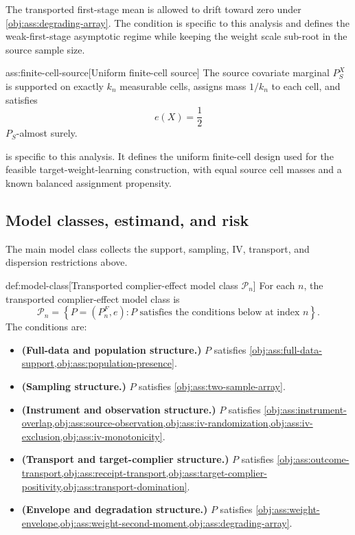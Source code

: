 The transported first-stage mean  is allowed to drift toward zero under \cref{obj:ass:degrading-array}. The condition is specific to this analysis and defines the weak-first-stage asymptotic regime while keeping the weight scale sub-root in the source sample size.

\begin{assumptionv}{ass:finite-cell-source}[Uniform finite-cell source]
The source covariate marginal \(P_S^X\) is supported on exactly \(k_n\) measurable cells, assigns mass \(1/k_n\) to each cell, and satisfies
\[
e(X)=\frac12
\]
\(P_S\)-almost surely.
\end{assumptionv}

 is specific to this analysis. It defines the uniform finite-cell design used for the feasible target-weight-learning construction, with equal source cell masses and a known balanced assignment propensity.

\subsection{Model classes, estimand, and risk}

The main model class collects the support, sampling, IV, transport, and dispersion restrictions above.

\begin{definitionv}{def:model-class}[Transported complier-effect model class \(\mathcal P_n\)]
For each \(n\), the transported complier-effect model class is
\[
\mathcal P_n
=
\left\{
P=(P_n^F,e):
P \text{ satisfies the conditions below at index } n
\right\}.
\]
The conditions are:
\begin{itemize}
\item \textbf{(Full-data and population structure.)} \(P\) satisfies \cref{obj:ass:full-data-support,obj:ass:population-presence}.
\item \textbf{(Sampling structure.)} \(P\) satisfies \cref{obj:ass:two-sample-array}.
\item \textbf{(Instrument and observation structure.)} \(P\) satisfies \cref{obj:ass:instrument-overlap,obj:ass:source-observation,obj:ass:iv-randomization,obj:ass:iv-exclusion,obj:ass:iv-monotonicity}.
\item \textbf{(Transport and target-complier structure.)} \(P\) satisfies \cref{obj:ass:outcome-transport,obj:ass:receipt-transport,obj:ass:target-complier-positivity,obj:ass:transport-domination}.
\item \textbf{(Envelope and degradation structure.)} \(P\) satisfies \cref{obj:ass:weight-envelope,obj:ass:weight-second-moment,obj:ass:degrading-array}.
\end{itemize}
\end{definitionv}

